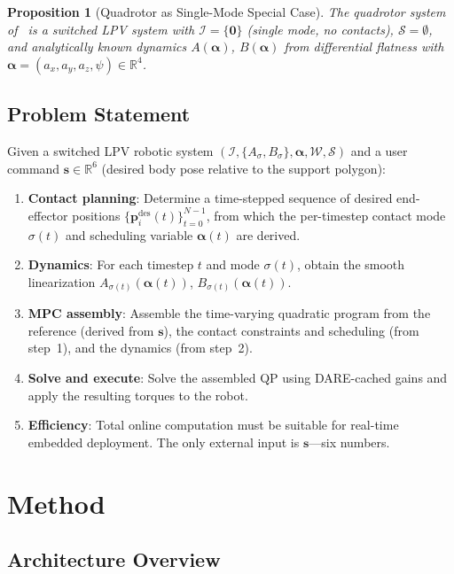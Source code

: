 \documentclass[letterpaper, 10pt, conference]{IEEEtran}
\newtheorem{proposition}{Proposition}
\newcommand{\R}{\mathbb{R}}
\newcommand{\balpha}{\bm{\alpha}}
\newcommand{\bp}{\bm{p}}
\newcommand{\cW}{\mathcal{W}}
\newcommand{\cS}{\mathcal{S}}
\newcommand{\cI}{\mathcal{I}}
\begin{document}
\begin{proposition}[Quadrotor as Single-Mode Special Case]
\label{prop:quad}
The quadrotor system of~\cite{zhang2025flat} is a
switched LPV system with $\cI = \{\bm{0}\}$ (single mode,
no contacts), $\cS = \emptyset$,
and analytically known dynamics
$A(\balpha)$, $B(\balpha)$ from differential flatness
with $\balpha = (a_x, a_y, a_z, \psi) \in \R^4$.
\end{proposition}

\subsection{Problem Statement}\label{sec:problem}

Given a switched LPV robotic system
$(\cI, \{A_\sigma, B_\sigma\}, \balpha, \cW, \cS)$
and a user command $\bm{s} \in \R^6$
(desired body pose relative to the support polygon):

\begin{enumerate}
  \item \textbf{Contact planning}: Determine a time-stepped
    sequence of desired end-effector positions
    $\{\bp_i^{\mathrm{des}}(t)\}_{t=0}^{N-1}$,
    from which the per-timestep contact mode
    $\sigma(t)$ and scheduling variable $\balpha(t)$
    are derived.
  \item \textbf{Dynamics}: For each timestep $t$ and mode
    $\sigma(t)$, obtain the smooth linearization
    $A_{\sigma(t)}(\balpha(t))$,
    $B_{\sigma(t)}(\balpha(t))$.
  \item \textbf{MPC assembly}: Assemble the time-varying
    quadratic program from the reference
    (derived from $\bm{s}$), the contact constraints
    and scheduling (from step~1), and the dynamics
    (from step~2).
  \item \textbf{Solve and execute}: Solve the assembled QP
    using DARE-cached gains and apply the resulting
    torques to the robot.
  \item \textbf{Efficiency}: Total online computation
    must be suitable for real-time embedded deployment.
    The only external input is $\bm{s}$---six numbers.
\end{enumerate}

\section{Method}\label{sec:method}

\subsection{Architecture Overview}\label{sec:architecture}
\end{document}
